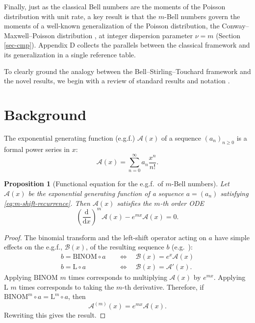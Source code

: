 \documentclass[a4paper]{amsart}
\numberwithin{equation}{section}
\newtheorem{proposition}[theorem]{Proposition}
\begin{document}
Finally, just as the classical Bell numbers are the moments of the Poisson distribution with unit rate, a key result is that the $m$-Bell numbers govern the moments of a well-known generalization of the Poisson distribution, the Conway--Maxwell--Poisson distribution \cite{shmueliUsefulDistributionFitting2005}, at integer dispersion parameter $\nu = m$ (Section \ref{sec-cmp}). Appendix D collects the parallels between the classical framework and its generalization in a single reference table.

To clearly ground the analogy between the Bell--Stirling--Touchard framework and the novel results, we begin with a review of standard results and notation \cite{comtet1974, sándor2004}.

\section{Background}
\noindent The exponential generating function (e.g.f.) $\mathcal{A}(x)$ of a sequence $(a_n)_{n \geq 0}$ is a formal power series in $x$:
%
\[
\mathcal{A}(x) = \sum_{n=0}^\infty a_n \frac{x^n}{n!}.
\]
%
\begin{proposition}[Functional equation for the e.g.f.\ of $m$-Bell numbers]\label{prop:mbell-egf}
Let $\mathcal{A}(x)$ be the exponential generating function of a sequence \( a = (a_n) \) satisfying \eqref{eq:m-shift-recurrence}.
Then \( \mathcal{A}(x) \) satisfies the $m$-th order ODE
\[
\left(\frac{\mathrm{d}}{\mathrm{d}x}\right)^m \mathcal{A}(x) - e^{mx} \mathcal{A}(x) = 0.
\]
\end{proposition}

\begin{proof}
The binomial transform and the left-shift operator acting on $a$ have simple effects on the e.g.f., $\mathcal{B}(x)$, of the resulting sequence $b$ (e.g.\ \cite{bernstein1995}):
%
\begin{equation}
\begin{aligned}
b = \mathrm{BINOM} \circ a \quad &\iff\quad \mathcal{B}(x) = e^x \mathcal{A}(x) \\
b = \mathrm{L} \circ a \quad &\iff\quad \mathcal{B}(x) = \mathcal{A}'(x).
\end{aligned}
\end{equation}
%
Applying $\mathrm{BINOM}$ $m$ times corresponds to multiplying $\mathcal{A}(x)$ by $e^{mx}$. Applying $\mathrm{L}$ $m$ times corresponds to taking the $m$-th derivative. Therefore, if \(\mathrm{BINOM}^m \circ a = \mathrm{L}^m \circ a\), then
%
\[
\mathcal{A}^{(m)}(x) = e^{mx} \mathcal{A}(x).
\]
%
Rewriting this gives the result.
\end{proof}
\end{document}
